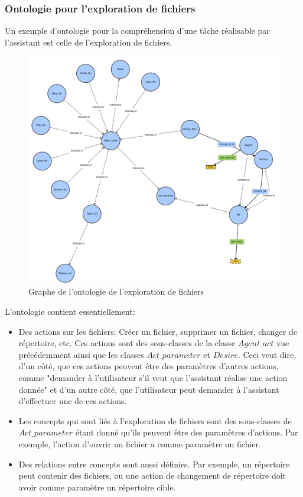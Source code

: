 \subsubsection*{Ontologie pour l'exploration de fichiers}\label{onto2}
Un exemple d'ontologie pour la compréhension d'une tâche réalisable par l'assistant est celle de l'exploration de fichiers.
\begin{figure}[H] 
	
	\centering
	\includegraphics[width=1.1\linewidth]{images/Conception/DM/onto_browser.png}
	\caption{Graphe de l'ontologie de l'exploration de fichiers}
\end{figure}\label{onto_browser}
L'ontologie contient essentiellement:
\begin{itemize}
	\item Des actions sur les fichiers: Créer un fichier, supprimer un fichier, changer de répertoire, etc. Ces actions sont des sous-classes de la classe  $Agent\_act$ vue précédemment ainsi que les classes $Act\_parameter$ et $Desire$. Ceci veut dire, d'un côté, que ces actions peuvent être des paramètres d'autres actions, comme "demander à l'utilisateur s'il veut que l'assistant réalise une action donnée" et d'un autre côté, que l'utilisateur peut demander à l'assistant d'effectuer une de ces actions. 
	\item Les concepts qui sont liés à l'exploration de fichiers sont des sous-classes de $Act\_parameter$ étant donné qu'ils peuvent  être des paramètres d'actions. Par exemple, l'action d'ouvrir un fichier a comme paramètre un fichier.
	\item Des relations entre concepts sont aussi définies. Par exemple, un répertoire peut contenir des fichiers, ou une action de changement de répertoire doit avoir comme paramètre un répertoire cible.
\end{itemize}
